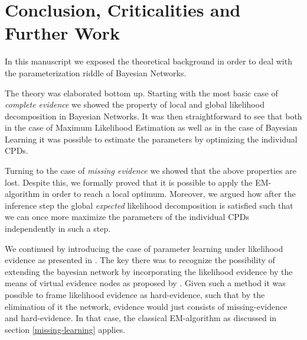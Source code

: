 \documentclass[11pt]{article}
\begin{document}
\begin{article}
\begin{algorithm*}[h!]
\begin{multicols}{2}
\begin{algorithmic}[1]
{\EndWhile
\EndProcedure

\end{algorithmic}
\end{multicols}
\end{algorithm*}

\newpage

\section{Conclusion, Criticalities and Further Work}
\label{conclusion}
In this manuscript we exposed the theoretical background in order
to deal with the parameterization riddle of Bayesian Networks.

The theory was elaborated bottom up. Starting with the most basic
case of \emph{complete evidence} we showed the property of local and
global likelihood decomposition in Bayesian Networks. It was then
straightforward to see that both in the case of Maximum Likelihood
Estimation as well as in the case of Bayesian Learning it was
possible to estimate the parameters by optimizing the individual
CPDs.

Turning to the case of \emph{missing evidence} we showed that the above
properties are lost. Despite this, we formally proved that it is
possible to apply the EM-algorithm in order to reach a local
optimum. Moreover, we argued how after the inference step the global
\emph{expected} likelihood decomposition is satisfied such that we can
once more maximize the parameters of the individual CPDs
independently in such a step.

We continued by introducing the case of parameter learning under
likelihood evidence as presented in \cite{Wasserkrug_all}. The key
there was to recognize the possibility of extending the bayesian
network by incorporating the likelihood evidence by the means of
virtual evidence nodes as proposed by
\cite{pearl1987evidential}. Given such a method it was possible to
frame likelihood evidence as hard-evidence, such that by the
elimination of it the network, evidence would just consists of
missing-evidence and hard-evidence. In that case, the classical
EM-algorithm as discussed in section \ref{missing-learning} applies.


\end{article}
\end{document}

